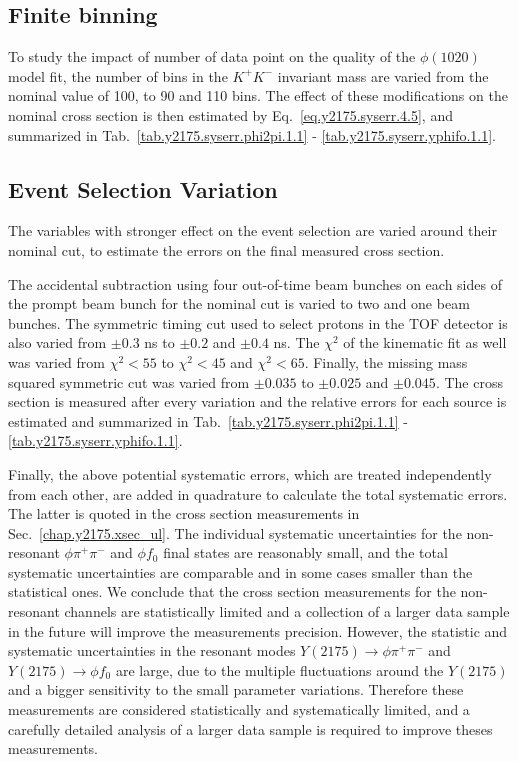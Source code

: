 \subsection{Finite binning}
\label{chap.y2175.syserr.bin}

To study the impact of number of data point on the quality of the $\phi(1020)$ model fit, the number of bins in the $K^+K^-$ invariant mass are varied from the nominal value of 100, to 90 and 110 bins. The effect of these modifications on the nominal cross section is then estimated by Eq.~\ref{eq.y2175.syserr.4.5}, and summarized in Tab.~\ref{tab.y2175.syserr.phi2pi.1.1} - \ref{tab.y2175.syserr.yphifo.1.1}.

\subsection{Event Selection Variation}
\label{chap.y2175.syserr.evt}

The variables with stronger effect on the event selection are varied around their nominal cut, to estimate the errors on the final measured cross section.
\par The accidental subtraction using four out-of-time beam bunches on each sides of the prompt beam bunch for the nominal cut is varied to two and one beam bunches. The symmetric timing cut used to select protons in the TOF detector is also varied from $\pm 0.3$ ns to $\pm 0.2$ and $\pm 0.4$ ns. The $\chi^2$ of the kinematic fit as well was varied from $\chi^{2}<55$ to $\chi^{2}<45$ and $\chi^{2}<65$. Finally, the missing mass squared symmetric cut was varied from $\pm 0.035$ to $\pm 0.025$ and $\pm 0.045$. The cross section is measured after every variation and the relative errors for each source is estimated and summarized in Tab.~\ref{tab.y2175.syserr.phi2pi.1.1} - \ref{tab.y2175.syserr.yphifo.1.1}.
~\par Finally, the above potential systematic errors, which are treated independently from each other, are added in quadrature to calculate the total systematic errors. The latter is quoted in the cross section measurements in Sec.~\ref{chap.y2175.xsec_ul}. The individual systematic uncertainties for the non-resonant $\phi \pi^{+} \pi^{-}$ and $\phi f_0$ final states are reasonably small, and the total systematic uncertainties are comparable and in some cases smaller than the statistical ones. We conclude that the cross section measurements for the non-resonant channels are statistically limited and a collection of a larger data sample in the future will improve the measurements precision. However, the statistic and systematic uncertainties in the resonant modes $Y(2175) \rightarrow \phi \pi^{+} \pi^{-}$ and $Y(2175) \rightarrow \phi f_0$ are large, due to the multiple fluctuations around the $Y(2175)$ and a bigger sensitivity to the small parameter variations. Therefore these measurements are considered statistically and systematically limited, and a carefully detailed analysis of a larger data sample is required to improve theses measurements.

